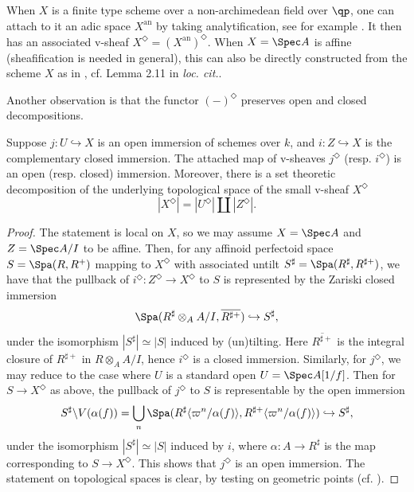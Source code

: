 \documentclass[letterpaper,11pt]{amsart}
\begin{document}
When $X$ is a finite type scheme over a non-archimedean field over $\qp$, one can attach to it an adic space $X^\mathrm{an}$ by taking analytification, see for example \cite[Definition 10.3]{hubner}. It then has an associated v-sheaf $X^\Diamond=(X^\mathrm{an})^\Diamond$. When $X=\Spec A$ is affine (sheafification is needed in general), this can also be directly constructed from the scheme $X$ as in \cite[Definition 2.10(2)]{AGLRLocalModels}, cf. Lemma 2.11 in \textit{loc. cit.}. 

Another observation is that the functor $(-)^\Diamond$ preserves open and closed decompositions. 
\begin{lemma}\label{lem: ExcisionBigDiamond}
    Suppose $j: U\hookrightarrow X$ is an open immersion of schemes over $k$, and $i:Z\hookrightarrow X$ is the complementary closed immersion.
    The attached map of v-sheaves $j^\Diamond$ (resp. $i^\Diamond$) is an open (resp. closed) immersion. Moreover, there is a set theoretic decomposition of the underlying topological space of the small v-sheaf $X^\Diamond$
    \[|X^\Diamond|=|U^\Diamond|\coprod |Z^\Diamond|.\]
\end{lemma}
\begin{proof}
    The statement is local on $X$, so we may assume $X=\Spec A$ and $Z=\Spec A/I$ to be affine. Then, for any affinoid perfectoid space $S=\Spa(R,R^+)$ mapping to $X^\Diamond$ with associated untilt $S^{\sharp} = \Spa(R^{\sharp},R^{\sharp+})$, we have that the pullback of $i^\Diamond:Z^\Diamond\to X^\Diamond$ to $S$ is represented by the Zariski closed immersion 
    \[\Spa(R^{\sharp} \otimes_A A/I,\overline{R^{\sharp+}})\hookrightarrow S^{\sharp},\]
    under the isomorphism $|S^{\sharp}| \simeq |S|$ induced by (un)tilting. Here $\overline{R^{\sharp+}}$ is the integral closure of $R^{\sharp+}$ in $R\otimes_A A/I$, hence $i^\Diamond$ is a closed immersion. Similarly, for $j^\Diamond$, we may reduce to the case where $U$ is a standard open $U=\Spec A[1/f]$. Then for $S\to X^\Diamond$ as above, the pullback of $j^\Diamond$ to $S$ is representable by the open immersion
    \[S^{\sharp}\backslash V(\alpha(f))=\bigcup_n \Spa(R^{\sharp}\langle\varpi^n/\alpha(f)\rangle, R^{\sharp+}\langle\varpi^n/\alpha(f)\rangle)\hookrightarrow S^{\sharp},\]
    under the isomorphism $|S^{\sharp}| \simeq |S|$ induced by $i$, where $\alpha:A\to R^{\sharp}$ is the map corresponding to $S\to X^\Diamond$. This shows that $j^\Diamond$ is an open immersion. The statement on topological spaces is clear, by testing on geometric points (cf. \cite[Lemma~3.3.2]{GHILZIsocComparison}).
\end{proof}
\end{document}
